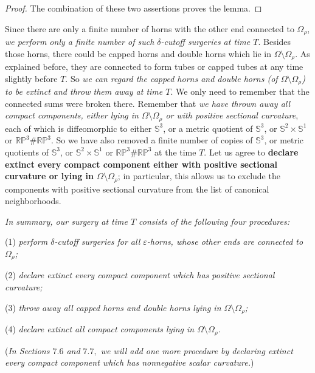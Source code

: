 \begin{proof}
The combination of these two assertions proves the lemma.
\end{proof}

Since there are only a finite number of horns with the other end
connected to $\Omega_\rho$, \emph{we perform only a finite number
of such $\delta$-cutoff surgeries at time $T$}. Besides those
horns, there could be capped horns and double horns which lie in
$\Omega \setminus \Omega_\rho$. As explained before, they are
connected to form tubes or capped tubes at any time slightly
before $T$. So \emph{we can regard the capped horns and double
horns (of $\Omega \setminus \Omega_\rho$) to be extinct and throw
them away at time $T$}. We only need to remember that the
connected sums were broken there. Remember that \emph{we have
thrown away all compact components, either lying in $\Omega
\setminus\Omega_\rho$ or with positive sectional curvature}, each
of which is diffeomorphic to either $\mathbb{S}^3$, or a metric
quotient of $\mathbb{S}^3$, or $\mathbb{S}^2 \times \mathbb{S}^1$
or $\mathbb{RP}^3\#\mathbb{RP}^3$. So we have also removed a
finite number of copies of $\mathbb{S}^3$, or metric quotients of
$\mathbb{S}^3$, or $\mathbb{S}^2 \times \mathbb{S}^1$ or
$\mathbb{RP}^3\#\mathbb{RP}^3$ at the time $T$. Let us agree to
\textbf{declare extinct every compact component either with
positive sectional curvature or lying in $\Omega
\setminus\Omega_\rho$}; in particular, this allows us to exclude
the components with positive sectional curvature from the list of
canonical neighborhoods.

\medskip
\emph{In summary, our surgery at time $T$ consists of the
following four procedures:}

(1) \emph{perform $\delta$-cutoff surgeries for all
$\varepsilon$-horns, whose other ends are  connected to
$\Omega_\rho$;}

(2) \emph{declare extinct every compact component which has
positive sectional curvature;}

(3) \emph{throw away all capped horns and double horns lying in
$\Omega \setminus \Omega_\rho$;}

(4) \emph{declare extinct all compact components lying in $\Omega
\setminus\Omega_\rho$.}

\medskip \noindent
({\it In Sections $7.6$ and $7.7,$ we will add one more procedure
by declaring extinct every compact component which has nonnegative
scalar curvature.})

